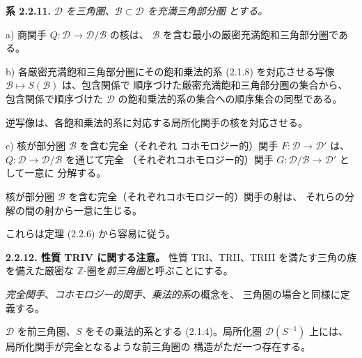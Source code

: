 \clearpage
{}%
\begingroup
\small
\setlength{\parskip}{0pt}%
\setlength{\emergencystretch}{1.5em}%

\noindent\textbf{系 2.2.11.}\quad
\begingroup\itshape
{}%
$\mathcal D$ を三角圏、$\mathcal B\subset\mathcal D$ を充満三角部分圏
とする。

\par\noindent a) 商関手
$Q\colon\mathcal D\longrightarrow\mathcal D/\mathcal B$ の核は、
$\mathcal B$ を含む最小の厳密充満飽和三角部分圏である。

\par\noindent b) 各厳密充満飽和三角部分圏にその飽和乗法的系 (2.1.8)
を対応させる写像 $\mathcal B\longmapsto S(\mathcal B)$ は、包含関係で
順序づけた厳密充満飽和三角部分圏の集合から、包含関係で順序づけた
$\mathcal D$ の飽和乗法的系の集合への順序集合の同型である。

逆写像は、各飽和乗法的系に対応する局所化関手の核を対応させる。

\par\noindent c) 核が部分圏 $\mathcal B$ を含む完全（それぞれ
コホモロジー的）関手 $F\colon\mathcal D\longrightarrow\mathcal D'$ は、
$Q\colon\mathcal D\longrightarrow\mathcal D/\mathcal B$ を通じて完全
（それぞれコホモロジー的）関手
$G\colon\mathcal D/\mathcal B\longrightarrow\mathcal D'$ として一意に
分解する。

核が部分圏 $\mathcal B$ を含む完全（それぞれコホモロジー的）関手の射は、
それらの分解の間の射から一意に生じる。
\endgroup

これらは定理 (2.2.6) から容易に従う。

\smallskip
\noindent\textbf{2.2.12. 性質 TRIV に関する注意。}
%
性質 TRI、TRII、TRIII を満たす三角の族を備えた厳密な
$\mathbb Z$-圏を\emph{前三角圏}と呼ぶことにする。

\emph{完全関手}、\emph{コホモロジー的関手}、\emph{乗法的系}の概念を、
三角圏の場合と同様に定義する。

$\mathcal D$ を前三角圏、$S$ をその乗法的系とする (2.1.4)。局所化圏
$\mathcal D(S^{-1})$ 上には、局所化関手が完全となるような前三角圏の
構造がただ一つ存在する。


